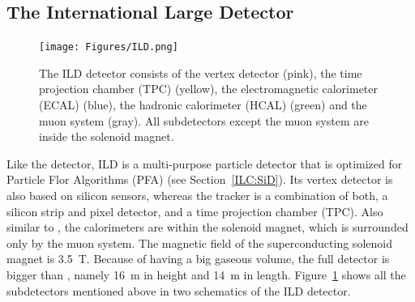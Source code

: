 \subsection{The International Large Detector} 
\begin{figure}[h]
\centering
\texttt{[image: Figures/ILD.png]}
\caption[Schematic drawing of the ILD detector]{The ILD detector consists of the vertex detector (pink), the time projection chamber (TPC) (yellow), the electromagnetic calorimeter (ECAL) (blue), the hadronic calorimeter (HCAL) (green) and the muon system (gray). All subdetectors except the muon system are inside the solenoid magnet.\cite[p. 34]{TDR1}}
\label{fig:ILD}
\end{figure}
Like the \sid detector, ILD is a multi-purpose particle detector that is optimized for Particle Flor Algorithms (PFA) (see Section~\ref{ILC:SiD}).
Its vertex detector is also based on silicon sensors, whereas the tracker is a combination of both, a silicon strip and pixel detector, and a time projection chamber (TPC).
Also similar to \sid, the calorimeters are within the solenoid magnet, which is surrounded only by the muon system.
The magnetic field of the superconducting solenoid magnet is \SI{3.5}{T}.
Because of having a big gaseous volume, the full detector is bigger than \sid, namely \SI{16}{m} in height and \SI{14}{m} in length.
Figure~\ref{fig:ILD} shows all the subdetectors mentioned above in two schematics of the ILD detector.
